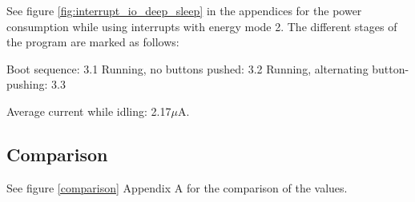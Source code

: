See figure \ref{fig:interrupt_io_deep_sleep} in the appendices for the power consumption while using interrupts with energy mode 2. The different stages of the program are marked as follows:

Boot sequence: 3.1
Running, no buttons pushed: 3.2
Running, alternating button-pushing: 3.3

Average current while idling: 2.17$\mu$A.

\subsection{Comparison}

See figure \ref{comparison} Appendix A for the comparison of the values.
